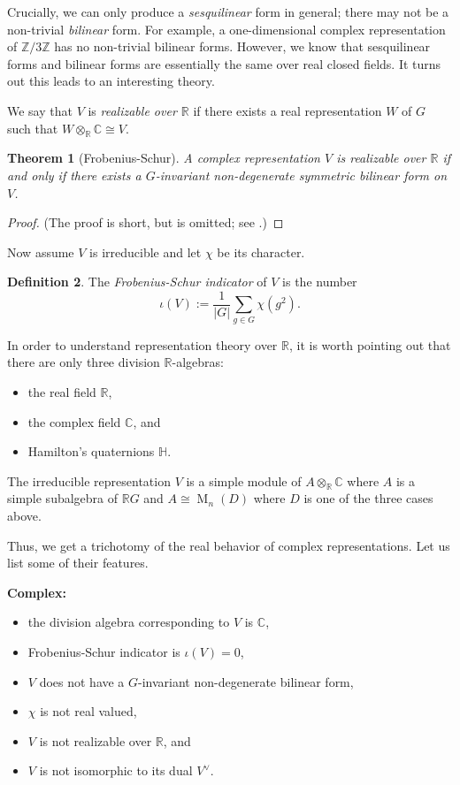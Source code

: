 \documentclass[12pt]{article}
\theoremstyle{plain}
\newtheorem{theorem}{Theorem}[section]
\theoremstyle{definition}
\newtheorem{definition}[theorem]{Definition}
\theoremstyle{remark}
\numberwithin{equation}{section}
\begin{document}
Crucially, we can only produce a \emph{sesquilinear} form in general;
there may not be a non-trivial \emph{bilinear} form.
For example, a one-dimensional complex representation of
$\mathbb{Z}/3\mathbb{Z}$ has no non-trivial bilinear forms.
However, we know that sesquilinear forms and bilinear forms are
essentially the same over real closed fields.
It turns out this leads to an interesting theory. 

We say that $V$ is \emph{realizable over $\mathbb{R}$} if there exists a
real representation $W$ of $G$ such that $W \otimes_\mathbb{R}
\mathbb{C} \cong V$.

\begin{theorem}[Frobenius-Schur] \label{thm:FrobSchur}
A complex representation $V$ is realizable over $\mathbb{R}$ if and only
if there exists a $G$-invariant non-degenerate symmetric bilinear form
on $V$.
\end{theorem}

\begin{proof}
(The proof is short, but is omitted;
see \cite[Theorem 31]{Serre}.)
\end{proof}

Now assume $V$ is irreducible and let $\chi$ be its character.

\begin{definition}
The \emph{Frobenius-Schur indicator} of $V$ is the number
\[
\iota(V) := \frac{1}{|G|}\sum_{g \in G} \chi(g^2).
\]
\end{definition}

In order to understand representation theory over $\mathbb{R}$, it is
worth pointing out that there are only three division
$\mathbb{R}$-algebras:
\begin{itemize}
\item the real field $\mathbb{R}$,
\item the complex field $\mathbb{C}$, and
\item Hamilton's quaternions $\mathbb{H}$.
\end{itemize}
The irreducible representation $V$ is a simple module of
$A \otimes_{\mathbb{R}} \mathbb{C}$ where $A$ is a simple subalgebra of
$\mathbb{R}G$ and $A \cong \operatorname{M}_n(D)$ where $D$ is one of
the three cases above.

Thus, we get a trichotomy of the real behavior of complex
representations.  Let us list some of their features.

\noindent
\textbf{Complex:}
\begin{itemize}
\item the division algebra corresponding to $V$ is $\mathbb{C}$,
\item Frobenius-Schur indicator is $\iota(V)=0$,
\item $V$ does not have a $G$-invariant non-degenerate bilinear form,
\item $\chi$ is not real valued,
\item $V$ is not realizable over $\mathbb{R}$, and
\item $V$ is not isomorphic to its dual $V^\vee$.
\end{itemize}
\end{document}
